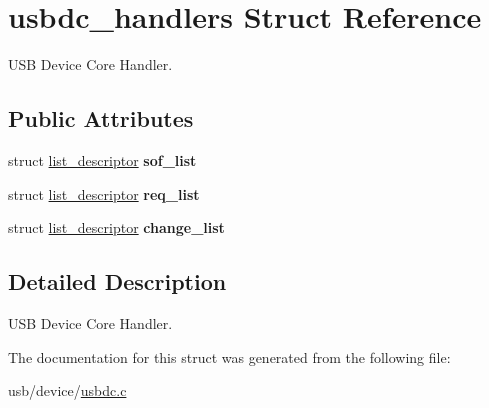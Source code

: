 \hypertarget{structusbdc__handlers}{}\section{usbdc\+\_\+handlers Struct Reference}
\label{structusbdc__handlers}


U\+SB Device Core Handler.  


\subsection*{Public Attributes}
\begin{DoxyCompactItemize}
\item 
\mbox{\label{structusbdc__handlers_aa438e9f30e54951b752c47a9d1e091d3}} 
struct \hyperlink{structlist__descriptor}{list\+\_\+descriptor} {\bfseries sof\+\_\+list}
\item 
\mbox{\label{structusbdc__handlers_aa3e33275037120de00da7a72982ae174}} 
struct \hyperlink{structlist__descriptor}{list\+\_\+descriptor} {\bfseries req\+\_\+list}
\item 
\mbox{\label{structusbdc__handlers_a78028f5b50faba2172aa2649c5e3b417}} 
struct \hyperlink{structlist__descriptor}{list\+\_\+descriptor} {\bfseries change\+\_\+list}
\end{DoxyCompactItemize}


\subsection{Detailed Description}
U\+SB Device Core Handler. 

The documentation for this struct was generated from the following file\+:\begin{DoxyCompactItemize}
\item 
usb/device/\hyperlink{usbdc_8c}{usbdc.\+c}\end{DoxyCompactItemize}
